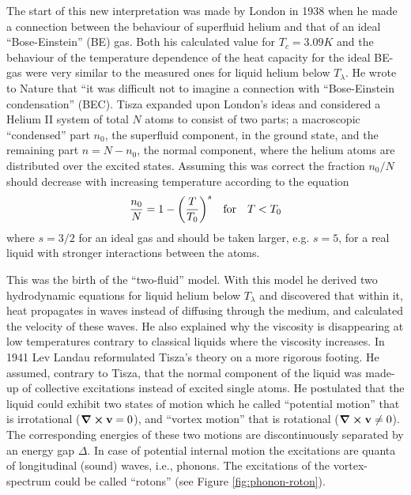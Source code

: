 		The start of this new interpretation was made by London\citep{London1938} in 1938 when he made a connection between the behaviour of superfluid helium and that of an ideal ``Bose-Einstein'' (BE) gas. Both his calculated value for $T_c=3.09\unit{K}$ and the behaviour of the temperature dependence of the heat capacity for the ideal BE-gas were very similar to the measured ones for liquid helium below $T_\lambda$. He wrote to Nature that ``it was difficult not to imagine a connection with ``Bose-Einstein condensation'' (BEC). Tisza expanded upon London's ideas\citep{Tisza1938} and considered a Helium II system of total $N$ atoms to consist of two parts; a macroscopic ``condensed'' part $n_0$, the superfluid component, in the ground state, and the remaining part $n=N-n_0$, the normal component, where the helium atoms are distributed over the excited states. Assuming this was correct the fraction $n_0/N$ should decrease with increasing temperature according to the equation
		\begin{align}
			\frac{n_0}{N} = 1-\qty(\frac{T}{T_0})^s \quad \text{for} \quad T<T_0
		\end{align}
		where $s=3/2$ for an ideal gas and should be taken larger, e.g. $s=5$, for a real liquid with stronger interactions between the atoms.
		
		This was the birth of the ``two-fluid'' model. With this model he derived two hydrodynamic equations for liquid helium below $T_\lambda$ and discovered that within it, heat propagates in waves instead of diffusing through the medium, and calculated the velocity of these waves. He also explained why the viscosity is disappearing at low temperatures contrary to classical liquids where the viscosity increases\citep{Tisza1938-1,Tisza1938-2,Tisza1940-1,Tisza1940-2}. In 1941 Lev Landau reformulated Tisza's theory on a more rigorous footing\citep{Landau1941,Landau1949}. He assumed, contrary to Tisza, that the normal component of the liquid was made-up of collective excitations instead of excited single atoms. He postulated that the liquid could exhibit two states of motion which he called ``potential motion'' that is irrotational ($\curl{\bm{\mathrm{v}}}=0$), and ``vortex motion'' that is rotational ($\curl{\bm{\mathrm{v}}} \neq 0$). The corresponding energies of these two motions are discontinuously separated by an energy gap $\Delta$. In case of potential internal motion  the excitations are quanta of longitudinal (sound) waves, i.e., phonons. The excitations of the vortex-spectrum could be called ``rotons'' (see Figure \ref{fig:phonon-roton}).

